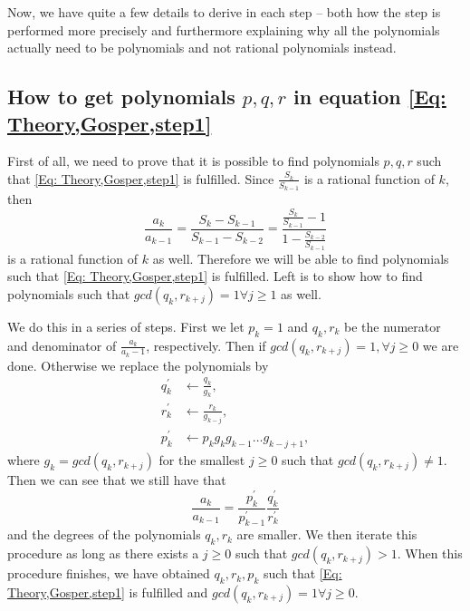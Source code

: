 Now, we have quite a few details to derive in each step -- both how the step is performed more precisely and furthermore explaining why all the polynomials actually need to be polynomials and not rational polynomials instead.

\subsection{How to get polynomials $p,q,r$ in equation \ref{Eq: Theory,Gosper,step1}}\label{Sub: pqr}
First of all, we need to prove that it is possible to find polynomials $p,q,r$ such that \ref{Eq: Theory,Gosper,step1} is fulfilled. Since $\frac{S_k}{S_{k-1}}$ is a rational function of $k$, then
\begin{equation}
  \frac{a_k}{a_{k-1}}=\frac{S_k-S_{k-1}}{S_{k-1}-S_{k-2}}=\frac{\frac{S_k}{S_{k-1}}-1}{1-\frac{S_{k-2}}{S_{k-1}}}
\end{equation}
is a rational function of $k$ as well. Therefore we will be able to find polynomials such that \ref{Eq: Theory,Gosper,step1} is fulfilled. Left is to show how to find polynomials such that $gcd(q_k,r_{k+j})=1 \forall j\geq 1$ as well.

We do this in a series of steps. First we let $p_k=1$ and $q_k, r_k$ be the numerator and denominator of $\frac{a_k}{a_k-1}$, respectively. Then if $gcd(q_k,r_{k+j})=1, \forall j\geq 0$ we are done. Otherwise we replace the polynomials by
\begin{equation}
  \begin{split}
    q_k^\prime & \leftarrow \frac{q_k}{g_k}, \\
    r_k^\prime & \leftarrow \frac{r_k}{g_{k-j}}, \\
    p_k^\prime & \leftarrow p_kg_kg_{k-1}\ldots g_{k-j+1},
  \end{split}
\end{equation}
where $g_k=gcd(q_k,r_{k+j})$ for the smallest $j\geq 0$ such that $gcd(q_k,r_{k+j})\neq 1$. Then we can see that we still have that
\begin{equation}
  \frac{a_k}{a_{k-1}} = \frac{p_k^\prime}{p_{k-1}^\prime}\frac{q_k^\prime}{r_k^\prime}
\end{equation}
and the degrees of the polynomials $q_k, r_k$ are smaller. We then iterate this procedure as long as there exists a $j\geq 0$ such that $gcd(q_k,r_{k+j})>1$. When this procedure finishes, we have obtained $q_k,r_k,p_k$ such that \ref{Eq: Theory,Gosper,step1} is fulfilled and $gcd(q_k,r_{k+j})=1 \forall j\geq 0$.

